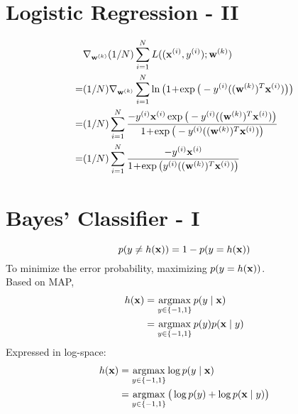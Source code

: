 \documentclass[article,11pt]{article}
\begin{document}
\section{Logistic Regression - II}
\begin{equation}
\begin{aligned}
& \nabla_{{\bf w}^{(k)}} (1/N) \sum_{i=1}^{N} L(({\bf x}^{(i)},y^{(i)}); {\bf w}^{(k)}) \\
= & 
(1/N) \nabla_{{\bf w}^{(k)}} \sum_{i=1}^{N} \ln\big(1\!+\!\exp\big(- y^{(i)} (({\bf w}^{(k)})^{T} {\bf x}^{(i)})\big)\big) \\
= &
(1/N) \sum_{i=1}^{N} \frac{-y^{(i)}{\bf x}^{(i)}\exp\big(- y^{(i)} (({\bf w}^{(k)})^{T} {\bf x}^{(i)})\big)}{1\!+\!\exp\big(- y^{(i)} (({\bf w}^{(k)})^{T} {\bf x}^{(i)})\big)} \\
= &
(1/N) \sum_{i=1}^{N} \frac{-y^{(i)}{\bf x}^{(i)}}{1\!+\!\exp\big( y^{(i)} (({\bf w}^{(k)})^{T} {\bf x}^{(i)})\big)}
\end{aligned}
\end{equation}
\newpage

\section{Bayes' Classifier - I}
\begin{equation}
	p(y\not = h({\bf x}))=1-p(y = h({\bf x}))
\end{equation}
To minimize the error probability, maximizing $p(y=h({\bf x}))$.\\ Based on MAP,
\begin{equation}
\begin{aligned}
	h({\bf x})&=\operatorname*{argmax}_{y \in \{-1,1\}}p(y \mid {\bf x}) \\
		  &= \operatorname*{argmax}_{y \in \{-1,1\}}p(y)p({\bf x} \mid y)
\end{aligned}
\end{equation}
Expressed in log-space:
	\begin{equation}
	\begin{aligned}
	h({\bf x})&=\operatorname*{argmax}_{y \in \{-1,1\}}\log p(y \mid {\bf x}) \\
	&= \operatorname*{argmax}_{y \in \{-1,1\}}\big (\log p(y)+ \log p({\bf x} \mid y)\big )
	\end{aligned}
	\end{equation}
\newpage
\end{document}
